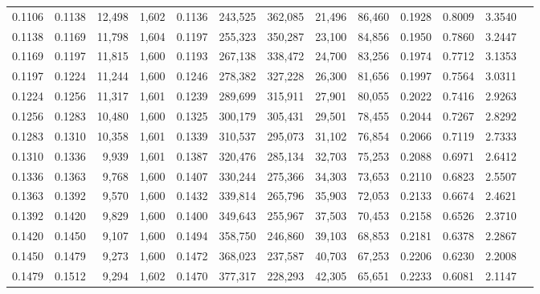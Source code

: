 \begin{tabular}{rrrrrrrrrrrrr}
0.1106 & 0.1138 & 12,498 & 1,602 &                                     0.1136 & 243,525 & 362,085 &  21,496 &  86,460 & 0.1928 & 0.8009 & 3.3540 \\
0.1138 & 0.1169 & 11,798 & 1,604 &                                     0.1197 & 255,323 & 350,287 &  23,100 &  84,856 & 0.1950 & 0.7860 & 3.2447 \\
0.1169 & 0.1197 & 11,815 & 1,600 &                                     0.1193 & 267,138 & 338,472 &  24,700 &  83,256 & 0.1974 & 0.7712 & 3.1353 \\
0.1197 & 0.1224 & 11,244 & 1,600 &                                     0.1246 & 278,382 & 327,228 &  26,300 &  81,656 & 0.1997 & 0.7564 & 3.0311 \\
0.1224 & 0.1256 & 11,317 & 1,601 &                                     0.1239 & 289,699 & 315,911 &  27,901 &  80,055 & 0.2022 & 0.7416 & 2.9263 \\
0.1256 & 0.1283 & 10,480 & 1,600 &                                     0.1325 & 300,179 & 305,431 &  29,501 &  78,455 & 0.2044 & 0.7267 & 2.8292 \\
0.1283 & 0.1310 & 10,358 & 1,601 &                                     0.1339 & 310,537 & 295,073 &  31,102 &  76,854 & 0.2066 & 0.7119 & 2.7333 \\
0.1310 & 0.1336 &  9,939 & 1,601 &                                     0.1387 & 320,476 & 285,134 &  32,703 &  75,253 & 0.2088 & 0.6971 & 2.6412 \\
0.1336 & 0.1363 &  9,768 & 1,600 &                                     0.1407 & 330,244 & 275,366 &  34,303 &  73,653 & 0.2110 & 0.6823 & 2.5507 \\
0.1363 & 0.1392 &  9,570 & 1,600 &                                     0.1432 & 339,814 & 265,796 &  35,903 &  72,053 & 0.2133 & 0.6674 & 2.4621 \\
0.1392 & 0.1420 &  9,829 & 1,600 &                                     0.1400 & 349,643 & 255,967 &  37,503 &  70,453 & 0.2158 & 0.6526 & 2.3710 \\
0.1420 & 0.1450 &  9,107 & 1,600 &                                     0.1494 & 358,750 & 246,860 &  39,103 &  68,853 & 0.2181 & 0.6378 & 2.2867 \\
0.1450 & 0.1479 &  9,273 & 1,600 &                                     0.1472 & 368,023 & 237,587 &  40,703 &  67,253 & 0.2206 & 0.6230 & 2.2008 \\
0.1479 & 0.1512 &  9,294 & 1,602 &                                     0.1470 & 377,317 & 228,293 &  42,305 &  65,651 & 0.2233 & 0.6081 & 2.1147 \\

\end{tabular}

